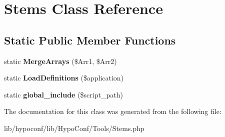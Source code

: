 \hypertarget{class_tools_1_1_stems}{
\section{\-Stems \-Class \-Reference}
\label{class_tools_1_1_stems}
}
\subsection*{\-Static \-Public \-Member \-Functions}
\begin{DoxyCompactItemize}
\item 
\hypertarget{class_tools_1_1_stems_a3cf666275331c9c7d50e3e7b689a4093}{
static {\bfseries \-Merge\-Arrays} (\$\-Arr1, \$\-Arr2)}
\label{class_tools_1_1_stems_a3cf666275331c9c7d50e3e7b689a4093}

\item 
\hypertarget{class_tools_1_1_stems_a23193adb73866affe97f50022ab4e113}{
static {\bfseries \-Load\-Definitions} (\$application)}
\label{class_tools_1_1_stems_a23193adb73866affe97f50022ab4e113}

\item 
\hypertarget{class_tools_1_1_stems_adc16e2d61f3236296db66bc3b22c2fa7}{
static {\bfseries global\-\_\-include} (\$script\-\_\-path)}
\label{class_tools_1_1_stems_adc16e2d61f3236296db66bc3b22c2fa7}

\end{DoxyCompactItemize}


\-The documentation for this class was generated from the following file\-:\begin{DoxyCompactItemize}
\item 
lib/hypoconf/lib/\-Hypo\-Conf/\-Tools/\-Stems.\-php\end{DoxyCompactItemize}
